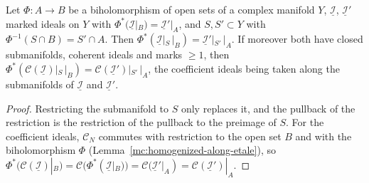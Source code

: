 \begin{lemma}
\label{mc:restricted-coefficient-transport}
\leanok
Let \(\Phi\colon A\to B\) be a biholomorphism of open sets of a complex manifold \(Y\), \(\underline{\mathcal I}\), \(\underline{\mathcal I}'\) marked ideals on \(Y\) with
\(\Phi^*(\underline{\mathcal I}|_B)=\underline{\mathcal I}'|_A\), and \(S,S'\subset Y\) with \(\Phi^{-1}(S\cap B)=S'\cap A\). Then
\(\Phi^*(\underline{\mathcal I}|_S\,|_B)=\underline{\mathcal I}'|_{S'}\,|_A\). If moreover both have closed submanifolds, coherent ideals and marks \(\ge1\), then
\(\Phi^*(\mathcal C(\underline{\mathcal I})|_S\,|_B)=\mathcal C(\underline{\mathcal I}')|_{S'}\,|_A\), the coefficient ideals being taken along the submanifolds of
\(\underline{\mathcal I}\) and \(\underline{\mathcal I}'\).
\end{lemma}
\begin{proof}
\leanok
Restricting the submanifold to \(S\) only replaces it, and the pullback of the restriction is the restriction of the pullback to the preimage of \(S\). For the
coefficient ideals, \(\mathcal C_N\) commutes with restriction to the open set \(B\) and with the biholomorphism \(\Phi\) (Lemma~\ref{mc:homogenized-along-etale}), so
\(\Phi^*(\mathcal C(\underline{\mathcal I})|_B)=\mathcal C(\Phi^*(\underline{\mathcal I}|_B))=\mathcal C(\underline{\mathcal I}'|_A)=\mathcal C(\underline{\mathcal I}')|_A\).
\end{proof}

